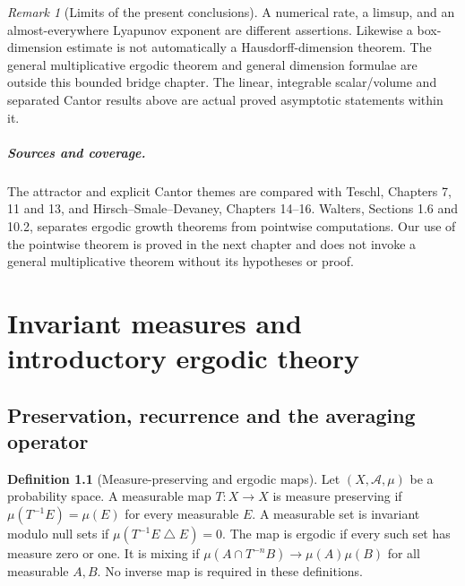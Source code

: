 \documentclass[11pt,oneside]{book}
\theoremstyle{definition}
\newtheorem{definition}[theorem]{Definition}
\theoremstyle{remark}\newtheorem{remark}[theorem]{Remark}
\begin{document}
\begin{remark}[Limits of the present conclusions]
A numerical rate, a limsup, and an almost-everywhere Lyapunov
exponent are different assertions. Likewise a box-dimension
estimate is not automatically a Hausdorff-dimension theorem.
The general multiplicative ergodic theorem and general dimension
formulae are outside this bounded bridge chapter. The linear,
integrable scalar/volume and separated Cantor results above are
actual proved asymptotic statements within it.
\end{remark}

\paragraph{Sources and coverage.}
The attractor and explicit Cantor themes are compared with Teschl,
Chapters 7, 11 and 13, and Hirsch--Smale--Devaney, Chapters 14--16.
Walters, Sections 1.6 and 10.2, separates ergodic growth theorems
from pointwise computations. Our use of the pointwise theorem is
proved in the next chapter and does not invoke a general
multiplicative theorem without its hypotheses or proof.



\chapter{Invariant measures and introductory ergodic theory}\label{ch:d13-19}

\section{Preservation, recurrence and the averaging operator}

\begin{definition}[Measure-preserving and ergodic maps]\label{d13:19:preserving-definition}
Let \((X,\mathcal A,\mu)\) be a probability space. A measurable map
\(T:X\to X\) is measure preserving if
\(\mu(T^{-1}E)=\mu(E)\) for every measurable \(E\).
A measurable set is invariant modulo null sets if
\(\mu(T^{-1}E\mathbin{\triangle}E)=0\).
The map is ergodic if every such set has measure zero or one.
It is mixing if
\(\mu(A\cap T^{-n}B)\to\mu(A)\mu(B)\) for all measurable \(A,B\).
No inverse map is required in these definitions.
\end{definition}
\end{document}
